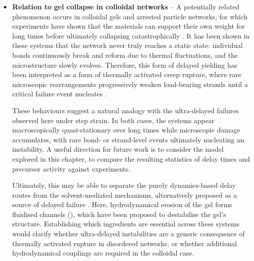 \begin{itemize}
    \item {\bf Relation to gel collapse in colloidal networks} -- A potentially related phenomenon occurs in colloidal gels and arrested particle networks, for which experiments have shown that the materials can support their own weight for long times before ultimately collapsing catastrophically \cite{harich_gravitational_2016,bartlett_sudden_2012,manley_gravitational_2005,starrs_collapse_2002}. It has been shown in these systems that the network never truly reaches a static state: individual bonds continuously break and reform due to thermal fluctuations, and the microstructure slowly evolves. Therefore, this form of delayed yielding has been interpreted as a form of thermally activated creep rupture, where rare microscopic rearrangements progressively weaken load-bearing strands until a critical failure event nucleates \cite{blindstrom_structures_2012,teece_gels_2014,sprakel_stress_2011}.
    
    These behaviours suggest a natural analogy with the ultra-delayed failures observed here under step strain. In both cases, the systems appear macroscopically quasi-stationary over long times while microscopic damage accumulates, with rare bond- or strand-level events ultimately nucleating an instability. A useful direction for future work is to consider the model explored in this chapter, to compare the resulting statistics of delay times and precursor activity against experiments.

    Ultimately, this may be able to separate the purely dynamics-based delay routes from the solvent-mediated mechanisms, alternatively proposed as a source of delayed failure \cite{harich_gravitational_2016,varga_modelling_2018,padmanabhan_gravitational_2018}. Here, hydrodynamical erosion of the gel forms fluidised channels (), which have been proposed to destabilise the gel's structure. Establishing which ingredients are essential across these systems would clarify whether ultra-delayed instabilities are a generic consequence of thermally activated rupture in disordered networks, or whether additional hydrodynamical couplings are required in the colloidal case.
    

\end{itemize}
